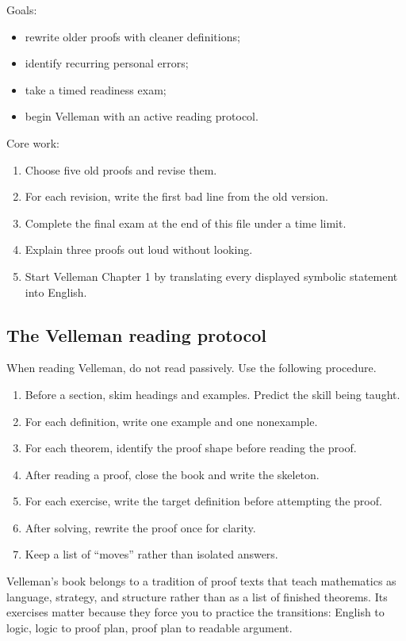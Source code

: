 Goals:

\begin{itemize}
\item rewrite older proofs with cleaner definitions;
\item identify recurring personal errors;
\item take a timed readiness exam;
\item begin Velleman with an active reading protocol.
\end{itemize}

Core work:

\begin{enumerate}
\item Choose five old proofs and revise them.
\item For each revision, write the first bad line from the old version.
\item Complete the final exam at the end of this file under a time limit.
\item Explain three proofs out loud without looking.
\item Start Velleman Chapter 1 by translating every displayed symbolic statement into English.
\end{enumerate}

\subsection{The Velleman reading protocol}

When reading Velleman, do not read passively. Use the following procedure.

\begin{enumerate}
\item Before a section, skim headings and examples. Predict the skill being taught.
\item For each definition, write one example and one nonexample.
\item For each theorem, identify the proof shape before reading the proof.
\item After reading a proof, close the book and write the skeleton.
\item For each exercise, write the target definition before attempting the proof.
\item After solving, rewrite the proof once for clarity.
\item Keep a list of ``moves'' rather than isolated answers.
\end{enumerate}

\begin{historybox}
Velleman's book belongs to a tradition of proof texts that teach mathematics as language, strategy, and structure rather than as a list of finished theorems. Its exercises matter because they force you to practice the transitions: English to logic, logic to proof plan, proof plan to readable argument.
\end{historybox}

